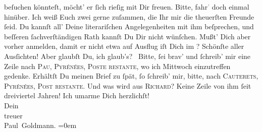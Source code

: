 \begin{ledgroupsized}[t]{13cm}
               beſuchen könnteſt, möcht’ er ſich rieſig mit Dir freuen. Bitte,
                  fahr\textcolor{gray}{’} doch einmal hinüber. Ich weiß Euch zwei gerne zuſammen,
               die Ihr mir die theuerſten Freunde ſeid. Du kannſt all’ Deine literariſchen Angelegenheiten mit ihm
               beſprechen, und beſſeren ſachverſtändigen Rath kannſt Du Dir {\pb}nicht wünſchen. Mußt’ Dich aber vorher anmelden,
               damit er nicht etwa auf Ausflug iſt{\dotsfour}\pend
           \pstart
           Dich im \label{K_L02701-6v}\label{K_L02701-6h}? Schönſte aller Ausſichten! Aber
               glaubſt Du, ich glaub’s? {\dotsfour}\pend
           \pstart
           Bitte, ſei brav’ und ſchreib’ mir eine Zeile nach \textsc{Pau}, \textsc{Pyrénées}, \textsc{Poste restante}, wo ich Mittwoch einzutreffen gedenke. Erhältſt Du {\pb}meinen Brief zu ſpät, ſo ſchreib’ mir, bitte, nach
                  \textsc{Cauterets}, \textsc{}{ }\textsc{Pyrénées}, \textsc{Post restante}.\pend
           \pstart
           Und was wird aus \textsc{Richard}? Keine Zeile von ihm ſeit dreiviertel Jahren!\pend
           \pstart
           Ich umarme Dich herzlichſt! {\\[\baselineskip]}Dein {\\[\baselineskip]}treuer {\\[\baselineskip]}\spacefill\mbox{Paul Goldmann.}\pend
           \leftskip=0em{}
         
         \endnumbering{}\end{ledgroupsized}  \newcommand{\dateiname}{L02701}\newcommand{\titel}{Paul Goldmann an Arthur Schnitzler, 5. 8. [1892]}\newcommand{\editorInnen}{Martin Anton Müller und Laura Untner}
      
